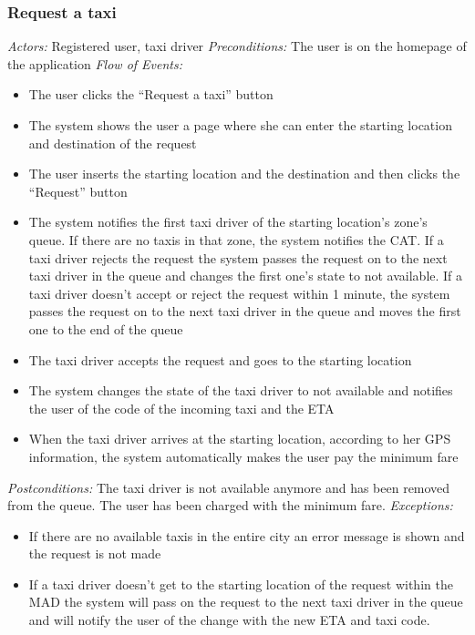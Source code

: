 \documentclass{article}
\begin{document}
\subsubsection{Request a taxi}
\textit{Actors:} Registered user, taxi driver
\textit{Preconditions:} The user is on the homepage of the application
\textit{Flow of Events:}
	\begin{itemize}
		\item  The user clicks the ``Request a taxi'' button
		\item  The system shows the user a page where she can enter the starting location and destination of the request
		\item  The user inserts the starting location and the destination and then clicks the ``Request'' button
		\item  The system notifies the first taxi driver of the starting location's zone's queue. If there are no taxis in that zone, the system notifies the CAT\@. If a taxi driver rejects the request the system passes the request on to the next taxi driver in the queue and changes the first one's state to not available. If a taxi driver doesn't accept or reject the request within 1 minute, the system passes the request on to the next taxi driver in the queue and moves the first one to the end of the queue
		\item  The taxi driver accepts the request and goes to the starting location
		\item  The system changes the state of the taxi driver to not available and notifies the user of the code of the incoming taxi and the ETA %
		\item  When the taxi driver arrives at the starting location, according to her GPS information, the system automatically makes the user pay the minimum fare 
	\end{itemize}
\textit{Postconditions:} The taxi driver is not available anymore and has been removed from the queue. The user has been charged with the minimum fare. %
\textit{Exceptions:}
	\begin{itemize}
		\item If there are no available taxis in the entire city an error message is shown and the request is not made
		\item If a taxi driver doesn't get to the starting location of the request within the MAD the system will pass on the request to the next taxi driver in the queue and will notify the user of the change with the new ETA and taxi code.
	\end{itemize}
	
\end{document}
